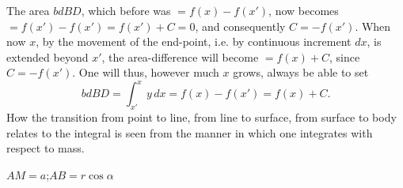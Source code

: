 \documentclass[12pt]{book}
\begin{document}
The area $bdBD$, which before was $= f(x) - f(x')$, now becomes
$= f(x') - f(x') = f(x') + C = 0$, and consequently $C = -f(x')$. When now
$x$, by the movement of the end-point, i.e. by continuous increment $dx$,
is extended beyond $x'$, the area-difference will become $= f(x) + C$, since
$C = -f(x')$. One will thus, however much $x$ grows, always be able to
set
\[
bdBD = \int_{x'}^{x} y\,dx = f(x) - f(x') = f(x) + C.
\]
How the transition from point to line, from line to surface, from
surface to body relates to the integral is seen from the manner
in which one integrates with respect to mass.

\begin{center}

$AM = a$;\quad $AB = r\cos\alpha$
\end{center}
\end{document}
